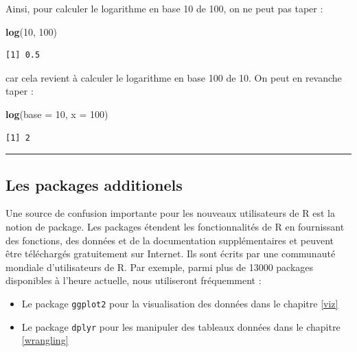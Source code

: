 \documentclass[a4paperpaper,]{article}
\newenvironment{Shaded}{\begin{snugshade}}{\end{snugshade}}
\newcommand{\KeywordTok}[1]{\textcolor[rgb]{0.13,0.29,0.53}{\textbf{#1}}}
\newcommand{\DataTypeTok}[1]{\textcolor[rgb]{0.13,0.29,0.53}{#1}}
\newcommand{\DecValTok}[1]{\textcolor[rgb]{0.00,0.00,0.81}{#1}}
\newcommand{\NormalTok}[1]{#1}
\providecommand{\tightlist}{%
  \setlength{\itemsep}{0pt}\setlength{\parskip}{0pt}}
\theoremstyle{definition}
\theoremstyle{definition}
\theoremstyle{definition}
\theoremstyle{remark}
\begin{document}
Ainsi, pour calculer le logarithme en base 10 de 100, on ne peut pas
taper :

\begin{Shaded}
\begin{Highlighting}[]
\KeywordTok{log}\NormalTok{(}\DecValTok{10}\NormalTok{, }\DecValTok{100}\NormalTok{)}
\end{Highlighting}
\end{Shaded}

\begin{verbatim}
[1] 0.5
\end{verbatim}

car cela revient à calculer le logarithme en base 100 de 10. On peut en
revanche taper :

\begin{Shaded}
\begin{Highlighting}[]
\KeywordTok{log}\NormalTok{(}\DataTypeTok{base =} \DecValTok{10}\NormalTok{, }\DataTypeTok{x =} \DecValTok{100}\NormalTok{)}
\end{Highlighting}
\end{Shaded}

\begin{verbatim}
[1] 2
\end{verbatim}

\begin{center}\rule{0.5\linewidth}{\linethickness}\end{center}

\subsection{Les packages additionels}\label{packages}

Une source de confusion importante pour les nouveaux utilisateurs de R
est la notion de package. Les packages étendent les fonctionnalités de R
en fournissant des fonctions, des données et de la documentation
supplémentaires et peuvent être téléchargés gratuitement sur Internet.
Ils sont écrits par une communauté mondiale d'utilisateurs de R. Par
exemple, parmi plus de 13000 packages disponibles à l'heure actuelle,
nous utiliseront fréquemment :

\begin{itemize}
\tightlist
\item
  Le package \texttt{ggplot2} pour la visualisation des données dans le
  chapitre \ref{viz}
\item
  Le package \texttt{dplyr} pour les manipuler des tableaux données dans
  le chapitre \ref{wrangling}
\end{itemize}
\end{document}
